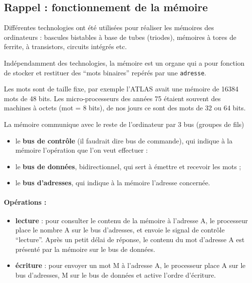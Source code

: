 \begin{multicols}{2}
\subsection{Rappel : fonctionnement de la mémoire}

Différentes technologies ont été utilisées pour réaliser
les mémoires des ordinateurs : bascules bistables à base 
de tubes (triodes),
mémoires à tores de ferrite, à transistors,  
circuits intégrés etc.



Indépendamment des technologies, la mémoire est un organe
qui a pour fonction de stocker et restituer des ``mots binaires''
repérés par une \texttt{adresse}.

Les mots sont de taille fixe, par
exemple l'ATLAS avait une mémoire de 16384 mots de 48 bits. 
Les micro-processeurs
des années 75 étaient souvent des machines à octets (mot = 8 bits), de 
nos jours ce sont des mots de 32 ou 64 bits.

La mémoire communique avec le reste de l'ordinateur par
3 bus (groupes de fils)
\begin{itemize}
\item le \textbf{bus de contrôle} (il faudrait dire bus de commande), 
qui indique à la mémoire l'opération 
que l'on veut effectuer : 
\item le \textbf{bus de données}, bidirectionnel, qui sert à émettre et
recevoir les mots ;
\item le \textbf{bus d'adresses}, qui indique à la mémoire l'adresse
concernée.
\end{itemize}


\paragraph{Opérations :}
\begin{itemize}
\item \textbf{lecture} : pour consulter le contenu de la mémoire à
  l'adresse A, le processeur place le nombre A sur le bus d'adresses,
  et envoie le signal de contrôle ``lecture''. Après un petit délai de
  réponse, le contenu du mot d'adresse A est présenté par la mémoire
  sur le bus de données.
\item \textbf{écriture} : pour envoyer un mot M à l'adresse A, le
  processeur place A sur le bus d'adresses, M sur le bus de données et
  active l'ordre d'écriture.
\end{itemize}


\end{multicols}
